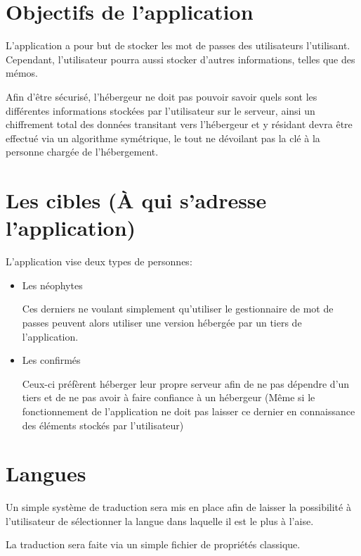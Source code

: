 \documentclass[oneside]{report}
\begin{document}
	\section{Objectifs de l'application}
	{
		\par L'application a pour but de stocker les mot de passes des utilisateurs l'utilisant. Cependant, l'utilisateur pourra aussi stocker d'autres informations, telles que des mémos.
		\vspace{.5cm}
		\par Afin d'être sécurisé, l'hébergeur ne doit pas pouvoir savoir quels sont les différentes informations stockées par l'utilisateur sur le serveur, ainsi un chiffrement total des données transitant vers l'hébergeur et y résidant devra être effectué via un algorithme symétrique, le tout ne dévoilant pas la clé à la personne chargée de l'hébergement.
	}

	\section{Les cibles (À qui s'adresse l'application)}
	{
		\par L'application vise deux types de personnes:
		\begin{itemize}
			\item Les néophytes \par Ces derniers ne voulant simplement qu'utiliser le gestionnaire de mot de passes peuvent alors utiliser une version hébergée par un tiers de l'application.
			\item Les confirmés \par Ceux-ci préfèrent héberger leur propre serveur afin de ne pas dépendre d'un tiers et de ne pas avoir à faire confiance à un hébergeur (Même si le fonctionnement de l'application ne doit pas laisser ce dernier en connaissance des éléments stockés par l'utilisateur)
		\end{itemize}
	}

	\section{Langues}
	{
		\par Un simple système de traduction sera mis en place afin de laisser la possibilité à l'utilisateur de sélectionner la langue dans laquelle il est le plus à l'aise.
		\par La traduction sera faite via un simple fichier de propriétés classique.
	}
\end{document}
